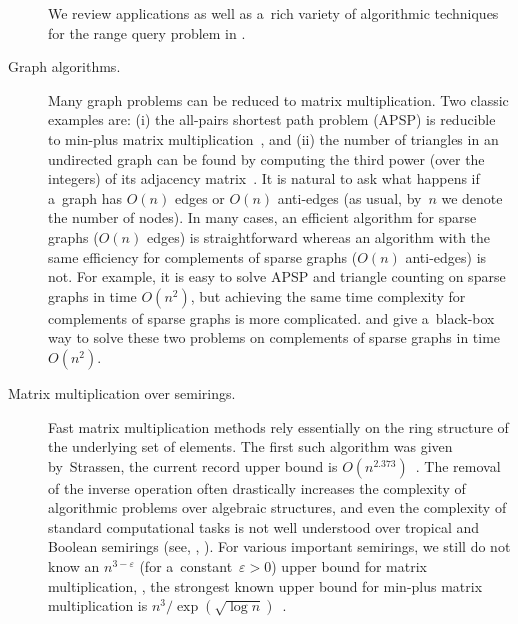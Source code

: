 \documentclass{toc}
\begin{document}
\begin{description}
We review applications as well as a~rich variety of algorithmic techniques for
the range query problem
in  .

\item[Graph algorithms.] Many graph problems can be reduced to matrix
multiplication.
Two classic examples are: (i) the all-pairs shortest path problem (APSP) is
reducible to min-plus matrix multiplication~\cite{DBLP:conf/focs/FischerM71},
and (ii) the number of triangles in an undirected graph can be found by
computing the third power (over the integers) of its adjacency
matrix~\cite{Itai_Rodeh_siam,Williams2009TriangleDV}. It is natural to ask what happens if
a~graph has $O(n)$ edges or $O(n)$ anti-edges
(as usual, by~$n$ we denote the number of nodes).
In many cases, an efficient algorithm
for sparse graphs ($O(n)$ edges) is straightforward
whereas an algorithm with the same efficiency
for complements of sparse graphs ($O(n)$ anti-edges) is not. For
example, it is easy to solve APSP and triangle counting on sparse graphs in
time $O(n^2)$, but achieving the same time complexity for complements of sparse
graphs is more complicated.
 and  give
a~black-box way to solve these two problems on complements of sparse graphs in
time $O(n^2)$.

\item[Matrix multiplication over semirings.] Fast matrix
multiplication methods rely essentially on the ring structure of the underlying
set of elements. The first such algorithm was given by~Strassen,
the current record upper bound is
$O(n^{2.373})$~\cite{DBLP:conf/stoc/Williams12, DBLP:conf/issac/Gall14a}.
The removal of the inverse operation often drastically increases the complexity
of algorithmic problems over algebraic structures, and even the complexity of
standard computational tasks %
is  %
not well understood over tropical and
Boolean semirings (see, \eg, \cite{Williams14,GrigorievP15}).
For various important semirings,
we still do not know an $n^{3-\varepsilon}$ (for a~constant~$\varepsilon>0$)
upper bound for matrix multiplication, \eg, the strongest known upper bound for
min-plus matrix multiplication is $n^3/\exp(\sqrt{\log n})$~\cite{Williams14}.


\end{description}
\end{document}
